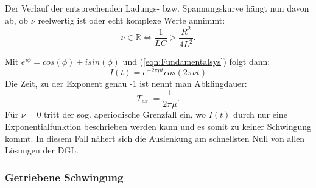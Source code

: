 \documentclass{scrartcl}
\begin{document}
    Der Verlauf der entsprechenden Ladungs- bzw. Spannungskurve hängt nun davon ab,
    ob $\nu$ reelwertig ist oder echt komplexe Werte annimmt:
    \begin{equation*}
        \nu \in \mathbb{R} \iff \frac{1}{LC} > \frac{R^2}{4L^2}.
    \end{equation*}

    Mit $e^{i\phi}= cos(\phi)+isin(\phi)$ und (\ref{eqn:Fundamentalsys}) folgt dann:
    \begin{equation}
        I(t) = e^{-2\pi\mu t}cos(2\pi\nu t)
    \end{equation}
    Die Zeit, zu der Exponent genau -1 ist nennt man Abklingdauer:
    \begin{equation}
        T_{ex} := \frac{1}{2\pi\mu}.
        \label{eqn:Abkling}
    \end{equation}
    Für $\nu = 0$ tritt der sog. aperiodische Grenzfall ein,
    wo $I(t)$ durch nur eine Exponentialfunktion beschrieben werden kann und es somit zu keiner Schwingung kommt.
    In diesem Fall nähert sich die Auslenkung am schnellsten Null von allen Lösungen der DGL.
    \subsubsection{Getriebene Schwingung}
    \label{subs:Getriebene Schwingung}
\end{document}
